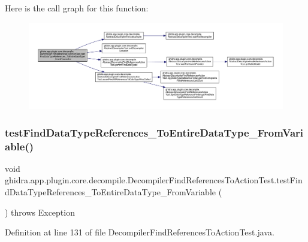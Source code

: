Here is the call graph for this function\+:
\nopagebreak
\begin{figure}[H]
\begin{center}
\leavevmode
\includegraphics[width=350pt]{classghidra_1_1app_1_1plugin_1_1core_1_1decompile_1_1_decompiler_find_references_to_action_test_abcbf2eac0b6b0916b549a6cd1b487dc0_cgraph}
\end{center}
\end{figure}
\mbox{\label{classghidra_1_1app_1_1plugin_1_1core_1_1decompile_1_1_decompiler_find_references_to_action_test_a242ce02c89f1f674a753ca16a1977111}} 
\subsubsection{\texorpdfstring{testFindDataTypeReferences\_ToEntireDataType\_FromVariable()}{testFindDataTypeReferences\_ToEntireDataType\_FromVariable()}}
{\footnotesize\ttfamily void ghidra.\+app.\+plugin.\+core.\+decompile.\+Decompiler\+Find\+References\+To\+Action\+Test.\+test\+Find\+Data\+Type\+References\+\_\+\+To\+Entire\+Data\+Type\+\_\+\+From\+Variable (\begin{DoxyParamCaption}{ }\end{DoxyParamCaption}) throws Exception\hspace{0.3cm}{\ttfamily [inline]}}



Definition at line 131 of file Decompiler\+Find\+References\+To\+Action\+Test.\+java.


